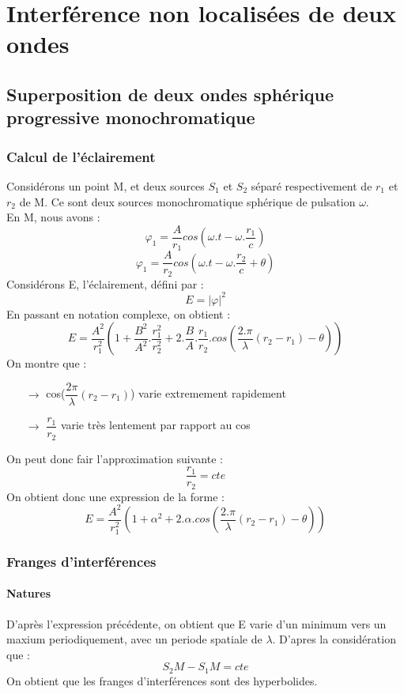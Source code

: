 \chapter{Interférence non localisées de deux ondes}
\section{Superposition de deux ondes sphérique progressive monochromatique}
\subsection{Calcul de l'éclairement}
Considérons un point M, et deux sources $S_1$ et $S_2$ séparé respectivement de $r_1$ et $r_2$ de M. Ce sont deux sources monochromatique sphérique de pulsation $\omega$.\\
En M, nous avons : 
$$\varphi_1 = \dfrac{A}{r_1}cos(\omega.t - \omega.\dfrac{r_1}{c})$$
$$\varphi_1 = \dfrac{A}{r_2}cos(\omega.t - \omega.\dfrac{r_2}{c} + \theta)$$
Considérons E, l'éclairement, défini par :
$$E = |\varphi|^2$$
En passant en notation complexe, on obtient : 
$$E = \dfrac{A^2}{r_1^2}(1 + \dfrac{B^2}{A^2}.\dfrac{r_1^2}{r_2^2} + 2.\dfrac{B}{A}.\dfrac{r_1}{r_2}.cos(\dfrac{2.\pi}{\lambda}(r_2-r_1) - \theta))$$
On montre que : 
\begin{itemize}
 \item[$\rightarrow$] cos($\dfrac{2\pi}{\lambda}(r_2-r_1)$) varie extremement rapidement
 \item[$\rightarrow$] $\dfrac{r_1}{r_2}$ varie très lentement par rapport au cos
\end{itemize}
On peut donc fair l'approximation suivante :
$$\dfrac{r_1}{r_2} = cte$$
On obtient donc une expression de la forme : 
$$E = \dfrac{A^2}{r_1^2}(1 + \alpha^2 + 2.\alpha.cos(\dfrac{2.\pi}{\lambda}(r_2-r_1) - \theta))$$
\subsection{Franges d'interférences}
\subsubsection{Natures}
D'après l'expression précédente, on obtient que E varie d'un minimum vers un maxium periodiquement, avec un periode spatiale de $\lambda$. D'apres la considération que : 
$$S_2M - S_1M = cte$$
On obtient que les franges d'interférences sont des hyperbolides.
